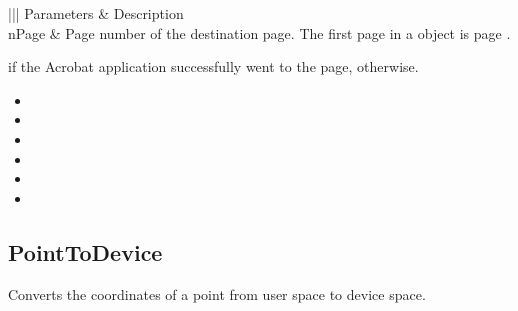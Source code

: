 \documentclass[letterpaper,12pt,english,openany,oneside]{sphinxmanual}
\begin{document}
\begin{savenotes}\sphinxattablestart
\centering
{}\label{\detokenize{IAC_API_OLE_Objects:section-38}}\nobreak
\begin{tabular}[t]{|||}
\hline
\sphinxstyletheadfamily 
Parameters
&\sphinxstyletheadfamily 
Description
\\
\hline
nPage
&
Page number of the destination page. The first page in a  object is page .
\\
\hline
\end{tabular}
\par
\sphinxattableend\end{savenotes}


 if the Acrobat application successfully went to the page,  otherwise.

\label{\detokenize{IAC_API_OLE_Objects:related-methods-59}}
\begin{itemize}
\item {} 
 

\item {} 
 

\item {} 
 

\item {} 
 

\item {} 
 

\item {} 
 

\end{itemize}




\subsection{PointToDevice}
\label{\detokenize{IAC_API_OLE_Objects:pointtodevice}}
Converts the coordinates of a point from user space to device space.
\end{document}
